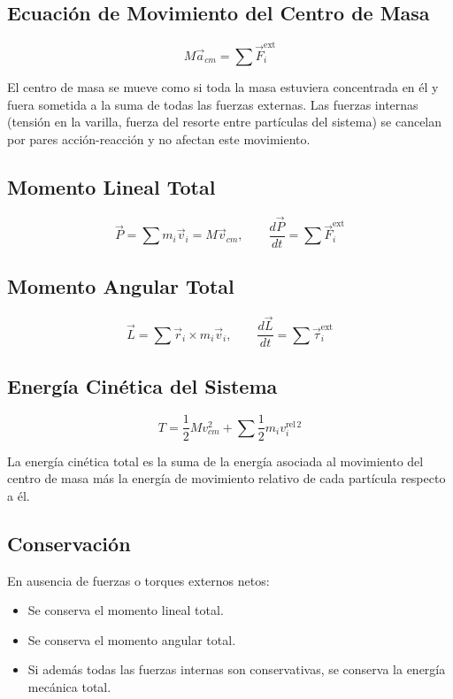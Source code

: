 \subsection*{Ecuación de Movimiento del Centro de Masa}

$$M\vec{a}_{cm} = \sum \vec{F}_i^{\text{ext}}$$

El centro de masa se mueve como si toda la masa estuviera concentrada en él y fuera sometida a la suma de todas las fuerzas externas. Las fuerzas internas (tensión en la varilla, fuerza del resorte entre partículas del sistema) se cancelan por pares acción-reacción y no afectan este movimiento.

\subsection*{Momento Lineal Total}

$$\vec{P} = \sum m_i \vec{v}_i = M\vec{v}_{cm}, \qquad \frac{d\vec{P}}{dt} = \sum \vec{F}_i^{\text{ext}}$$

\subsection*{Momento Angular Total}

$$\vec{L} = \sum \vec{r}_i \times m_i\vec{v}_i, \qquad \frac{d\vec{L}}{dt} = \sum \vec{\tau}_i^{\text{ext}}$$

\subsection*{Energía Cinética del Sistema}

$$T = \frac{1}{2}M v_{cm}^2 + \sum \frac{1}{2}m_i v_i^{\text{rel}\,2}$$

La energía cinética total es la suma de la energía asociada al movimiento del centro de masa más la energía de movimiento relativo de cada partícula respecto a él.

\subsection*{Conservación}

En ausencia de fuerzas o torques externos netos:
\begin{itemize}
    \item Se conserva el momento lineal total.
    \item Se conserva el momento angular total.
    \item Si además todas las fuerzas internas son conservativas, se conserva la energía mecánica total.
\end{itemize}

